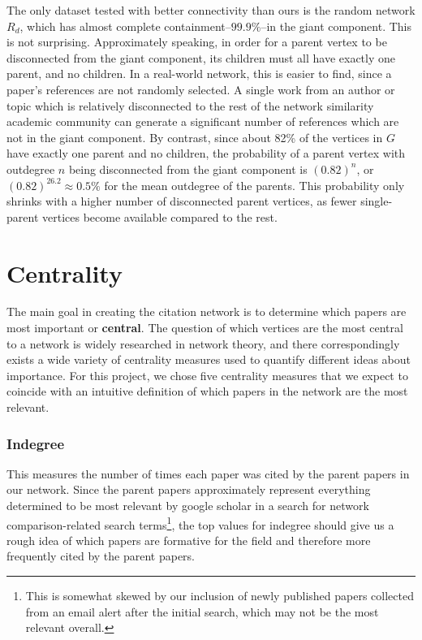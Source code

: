 \documentclass[12pt]{thesis}
\theoremstyle{plain}
\theoremstyle{definition}
\theoremstyle{remark}
\begin{document}
The only dataset tested with better connectivity than ours is the random network $R_d$, which has almost complete containment--$99.9\%$--in the giant component. This is not surprising. Approximately speaking, in order for a parent vertex to be disconnected from the giant component, its children must all have exactly one parent, and no children.  In a real-world network, this is easier to find, since a paper's references are not randomly selected. A single work from an author or topic which is relatively disconnected to the rest of the network similarity academic community can generate a significant number of references which are not in the giant component. By contrast, since about 82\% of the vertices in $G$ have exactly one parent and no children, the probability of a parent vertex with outdegree $n$ being disconnected from the giant component is $(0.82)^n$, or $(0.82)^{26.2} \approx 0.5\%$ for the mean outdegree of the parents. This probability only shrinks with a higher number of disconnected parent vertices, as fewer single-parent vertices become available compared to the rest.

\section{Centrality}

The main goal in creating the citation network is to determine which papers are most important or \textbf{central}. The question of which vertices are the most central to a network is widely researched in network theory, and there correspondingly exists a wide variety of centrality measures used to quantify different ideas about importance. For this project, we chose five centrality measures that we expect to coincide with an intuitive definition of which papers in the network are the most relevant.

\subsubsection{Indegree} This measures the number of times each paper was cited by the parent papers in our network. Since the parent papers approximately represent everything determined to be most relevant by google scholar in a search for network comparison-related search terms\footnote{This is somewhat skewed by our inclusion of newly published papers collected from an email alert after the initial search, which may not be the most relevant overall.}, the top values for indegree should give us a rough idea of which papers are formative for the field and therefore more frequently cited by the parent papers.
\end{document}
